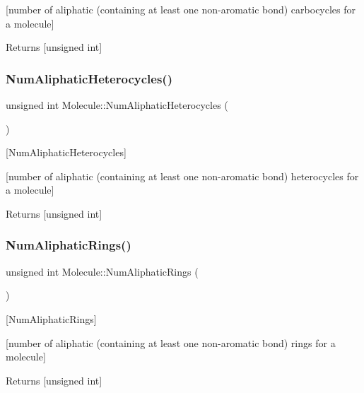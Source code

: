 \mbox{[}number of aliphatic (containing at least one non-\/aromatic bond) carbocycles for a molecule\mbox{]}

\begin{DoxyReturn}{Returns}
\mbox{[}unsigned int\mbox{]} 
\end{DoxyReturn}
\mbox{\label{class_molecule_a9c5af0a753b98601782bb2d98021793a}} 
\subsubsection{\texorpdfstring{Num\+Aliphatic\+Heterocycles()}{NumAliphaticHeterocycles()}}
{\footnotesize\ttfamily unsigned int Molecule\+::\+Num\+Aliphatic\+Heterocycles (\begin{DoxyParamCaption}{ }\end{DoxyParamCaption})}



\mbox{[}Num\+Aliphatic\+Heterocycles\mbox{]} 

\mbox{[}number of aliphatic (containing at least one non-\/aromatic bond) heterocycles for a molecule\mbox{]}

\begin{DoxyReturn}{Returns}
\mbox{[}unsigned int\mbox{]} 
\end{DoxyReturn}
\mbox{\label{class_molecule_a6170e58d6f19e2023378975bcf93c8d7}} 
\subsubsection{\texorpdfstring{Num\+Aliphatic\+Rings()}{NumAliphaticRings()}}
{\footnotesize\ttfamily unsigned int Molecule\+::\+Num\+Aliphatic\+Rings (\begin{DoxyParamCaption}{ }\end{DoxyParamCaption})}



\mbox{[}Num\+Aliphatic\+Rings\mbox{]} 

\mbox{[}number of aliphatic (containing at least one non-\/aromatic bond) rings for a molecule\mbox{]}

\begin{DoxyReturn}{Returns}
\mbox{[}unsigned int\mbox{]} 
\end{DoxyReturn}
\mbox{\label{class_molecule_a48326bca7f346cee15f4c6f251ba8788}} 
